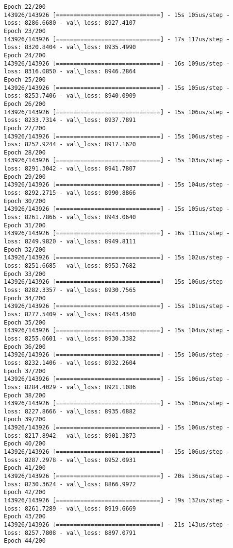 \documentclass[11pt]{article}
\begin{document}
\begin{Verbatim}[commandchars=\\\{\}]
Epoch 22/200
143926/143926 [==============================] - 15s 105us/step - loss: 8286.6680 - val\_loss: 8927.4107
Epoch 23/200
143926/143926 [==============================] - 17s 117us/step - loss: 8320.8404 - val\_loss: 8935.4990
Epoch 24/200
143926/143926 [==============================] - 16s 109us/step - loss: 8316.0850 - val\_loss: 8946.2864
Epoch 25/200
143926/143926 [==============================] - 15s 105us/step - loss: 8253.7406 - val\_loss: 8940.0909
Epoch 26/200
143926/143926 [==============================] - 15s 106us/step - loss: 8233.7314 - val\_loss: 8937.7891
Epoch 27/200
143926/143926 [==============================] - 15s 106us/step - loss: 8252.9244 - val\_loss: 8917.1620
Epoch 28/200
143926/143926 [==============================] - 15s 103us/step - loss: 8291.3042 - val\_loss: 8941.7807
Epoch 29/200
143926/143926 [==============================] - 15s 104us/step - loss: 8292.2715 - val\_loss: 8990.8866
Epoch 30/200
143926/143926 [==============================] - 15s 105us/step - loss: 8261.7866 - val\_loss: 8943.0640
Epoch 31/200
143926/143926 [==============================] - 16s 111us/step - loss: 8249.9820 - val\_loss: 8949.8111
Epoch 32/200
143926/143926 [==============================] - 15s 102us/step - loss: 8251.6685 - val\_loss: 8953.7682
Epoch 33/200
143926/143926 [==============================] - 15s 106us/step - loss: 8282.3357 - val\_loss: 8930.7565
Epoch 34/200
143926/143926 [==============================] - 15s 101us/step - loss: 8277.5409 - val\_loss: 8943.4340
Epoch 35/200
143926/143926 [==============================] - 15s 104us/step - loss: 8255.0601 - val\_loss: 8930.3382
Epoch 36/200
143926/143926 [==============================] - 15s 106us/step - loss: 8232.1406 - val\_loss: 8932.2604
Epoch 37/200
143926/143926 [==============================] - 15s 106us/step - loss: 8284.4029 - val\_loss: 8921.1086
Epoch 38/200
143926/143926 [==============================] - 15s 106us/step - loss: 8227.8666 - val\_loss: 8935.6882
Epoch 39/200
143926/143926 [==============================] - 15s 106us/step - loss: 8217.8942 - val\_loss: 8901.3873
Epoch 40/200
143926/143926 [==============================] - 15s 106us/step - loss: 8287.2978 - val\_loss: 8952.0931
Epoch 41/200
143926/143926 [==============================] - 20s 136us/step - loss: 8230.3624 - val\_loss: 8866.9972
Epoch 42/200
143926/143926 [==============================] - 19s 132us/step - loss: 8261.7289 - val\_loss: 8919.6669
Epoch 43/200
143926/143926 [==============================] - 21s 143us/step - loss: 8257.7808 - val\_loss: 8897.0791
Epoch 44/200

\end{Verbatim}
\end{document}
